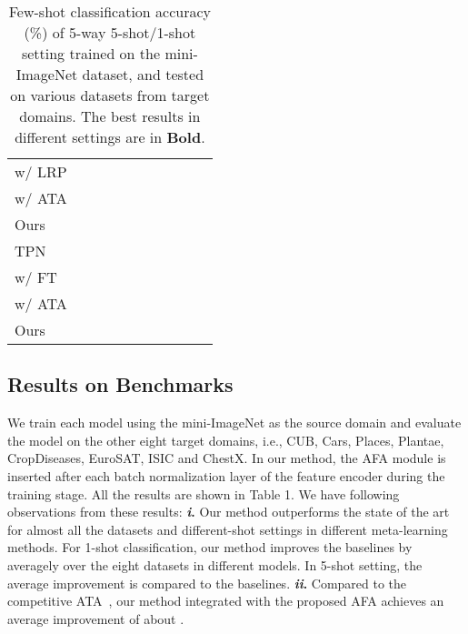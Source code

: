 \documentclass[runningheads]{utils/llncs}
\begin{document}
\begin{table}[t]
\begin{tabular}{lccccccccc}
         w/ LRP~\cite{SunLSZCB20}& & & & & & & &  \\
         w/ ATA~\cite{WangD21}& &\bm{} & & &\bm{} & & &  \\
         Ours& \bm{}& &\bm{} &\bm{} &\bm{} &\bm{} &\bm{} &\bm{}  \\ \hline
         TPN~\cite{LiuLPKYHY19}& & & & & & & &  \\
         w/ FT~\cite{TsengLH020}& & & & & & & &  \\
         w/ ATA~\cite{WangD21}&\bm{}&\bm{} & & &\bm{} & & &\bm{}  \\
         Ours& & &\bm{} &\bm{} & &\bm{} &\bm{} &  \\ \hline
    \end{tabular}
    \caption{Few-shot classification accuracy (\%) of 5-way 5-shot/1-shot setting trained on the mini-ImageNet dataset, and tested on various datasets from target domains. 
The best results in different settings are in \textbf{Bold}. 
    }
    \label{tab:base}
\end{table} 
\subsection{Results on Benchmarks}

We train each model using the mini-ImageNet as the source domain and evaluate the model on the other eight target domains, i.e., CUB, Cars, Places, Plantae, CropDiseases, EuroSAT, ISIC and ChestX.
In our method, the AFA module is inserted after each batch normalization layer of the feature encoder during the training stage. 
All the results are shown in Table 1. We have following observations from these results:
\textbf{\emph{i}.}
Our method outperforms the state of the art for almost all the datasets and different-shot settings in different meta-learning methods. 
For 1-shot classification, our method improves the baselines by  averagely over the eight datasets in different models. 
In 5-shot setting, the average improvement is  compared to the baselines.
\textbf{\emph{ii}.}
Compared to the competitive ATA~\cite{WangD21}, our method integrated with the proposed AFA achieves an average improvement of about .
\end{document}
